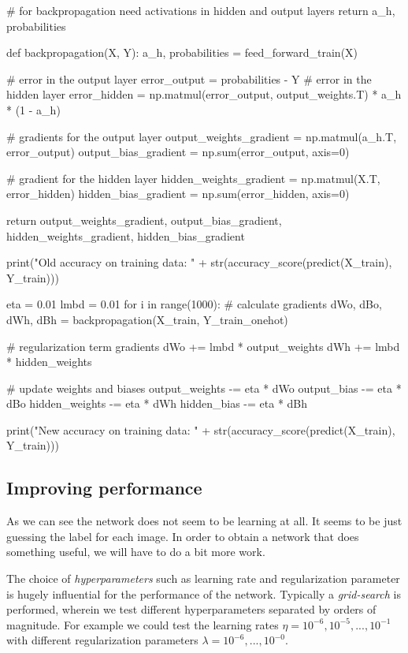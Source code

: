 \documentclass[%
oneside,                 %
final,                   %
10pt]{article}
\begin{document}
    # for backpropagation need activations in hidden and output layers
    return a_h, probabilities

def backpropagation(X, Y):
    a_h, probabilities = feed_forward_train(X)
    
    # error in the output layer
    error_output = probabilities - Y
    # error in the hidden layer
    error_hidden = np.matmul(error_output, output_weights.T) * a_h * (1 - a_h)
    
    # gradients for the output layer
    output_weights_gradient = np.matmul(a_h.T, error_output)
    output_bias_gradient = np.sum(error_output, axis=0)
    
    # gradient for the hidden layer
    hidden_weights_gradient = np.matmul(X.T, error_hidden)
    hidden_bias_gradient = np.sum(error_hidden, axis=0)

    return output_weights_gradient, output_bias_gradient, hidden_weights_gradient, hidden_bias_gradient

print("Old accuracy on training data: " + str(accuracy_score(predict(X_train), Y_train)))

eta = 0.01
lmbd = 0.01
for i in range(1000):
    # calculate gradients
    dWo, dBo, dWh, dBh = backpropagation(X_train, Y_train_onehot)
    
    # regularization term gradients
    dWo += lmbd * output_weights
    dWh += lmbd * hidden_weights
    
    # update weights and biases
    output_weights -= eta * dWo
    output_bias -= eta * dBo
    hidden_weights -= eta * dWh
    hidden_bias -= eta * dBh

print("New accuracy on training data: " + str(accuracy_score(predict(X_train), Y_train)))
\epycod

\subsection{Improving performance}

As we can see the network does not seem to be learning at all. It seems to be just guessing the label for each image.  
In order to obtain a network that does something useful, we will have to do a bit more work.  

The choice of \emph{hyperparameters} such as learning rate and regularization parameter is hugely influential for the performance of the network. Typically a \emph{grid-search} is performed, wherein we test different hyperparameters separated by orders of magnitude. For example we could test the learning rates $\eta = 10^{-6}, 10^{-5},...,10^{-1}$ with different regularization parameters $\lambda = 10^{-6},...,10^{-0}$.  
\end{document}
